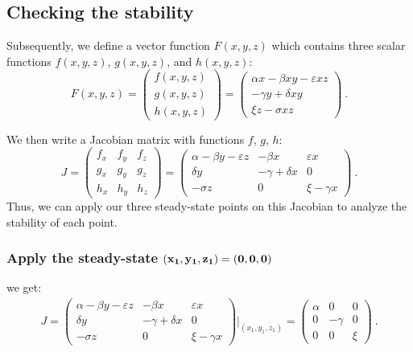 \documentclass{article}
\begin{document}
\subsection{Checking the stability}
\noindent Subsequently, we define a vector function $F(x,y,z)$ which contains three scalar functions $f(x,y,z)$, $g(x,y,z)$, and $h(x,y,z)$:
$$
F(x,y,z) 
= \begin{pmatrix}
f(x,y,z)\\
g(x,y,z)\\
h(x,y,z)
\end{pmatrix} 
= \begin{pmatrix}
\alpha x - \beta xy - \varepsilon xz \\
-\gamma y + \delta xy\\
\xi z - \sigma xz
\end{pmatrix} \ .
$$

\noindent We then write a Jacobian matrix with functions $f$, $g$, $h$:
$$
J = 
\begin{pmatrix}
f_x & f_y & f_z\\
g_x & g_y & g_z\\
h_x & h_y & h_z
\end{pmatrix} 
= \begin{pmatrix}
\alpha - \beta y - \varepsilon z & -\beta x & \varepsilon x \\
\delta y & -\gamma + \delta x  & 0\\
- \sigma z & 0 & \xi - \gamma x
\end{pmatrix} \ .
$$
\noindent Thus, we can apply our three steady-state points on this Jacobian to analyze the stability of each point.

\subsubsection*{Apply the steady-state $\bf (x_1,y_1,z_1) = (0, 0, 0)$}
we get:
\begin{align}
J
= \begin{pmatrix}
\alpha - \beta y - \varepsilon z & -\beta x & \varepsilon x \\
\delta y & -\gamma + \delta x  & 0\\
- \sigma z & 0 & \xi - \gamma x
\end{pmatrix}\Big|_{(x_1, y_1,z_1)}
= \begin{pmatrix}
\alpha & 0 & 0 \\
0 & -\gamma & 0\\
0 & 0 & \xi
\end{pmatrix} \ .
\tag{3.1}
\end{align}
\end{document}
